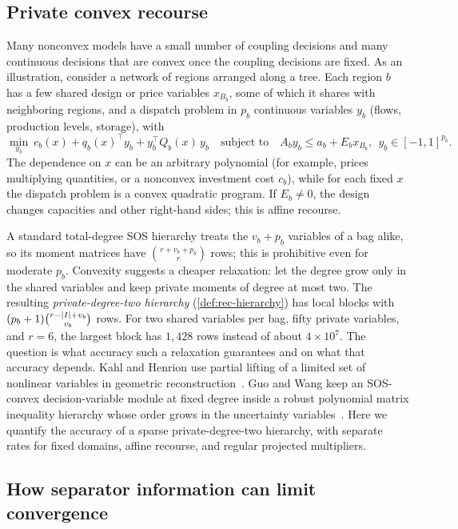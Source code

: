\subsection{Private convex recourse}\label{sec:intro-recourse}

Many nonconvex models have a small number of coupling decisions and many
continuous decisions that are convex once the coupling decisions are fixed.
As an illustration, consider a network of regions arranged along a tree.
Each region $b$ has a few shared design or price variables $x_{B_b}$, some
of which it shares with neighboring regions, and a dispatch problem in
$p_b$ continuous variables $y_b$ (flows, production levels, storage), with
\[
  \min_{y_b}\ c_b(x)+q_b(x)^{\top}y_b+y_b^{\top}Q_b(x)\,y_b
  \quad\text{subject to}\quad A_by_b\le a_b+E_bx_{B_b},\ \ y_b\in[-1,1]^{p_b}.
\]
The dependence on $x$ can be an arbitrary polynomial (for example, prices
multiplying quantities, or a nonconvex investment cost $c_b$), while for
each fixed $x$ the dispatch problem is a convex quadratic program. If
$E_b\ne0$, the design changes capacities and other right-hand sides; this
is affine recourse.

A standard total-degree SOS hierarchy treats the $v_b+p_b$ variables of a
bag alike, so its moment matrices have $\binom{r+v_b+p_b}{r}$ rows; this is
prohibitive even for moderate $p_b$. Convexity suggests a cheaper
relaxation: let the degree grow only in the shared variables and keep
private moments of degree at most two. The resulting
\emph{private-degree-two hierarchy} (\cref{def:rec-hierarchy}) has local
blocks with $(p_b+1)\binom{r-\lvert I\rvert+v_b}{v_b}$ rows. For two shared
variables per bag, fifty private variables, and $r=6$, the largest block has
$1{,}428$ rows instead of about $4\times10^7$. The question is what accuracy
such a relaxation guarantees and on what that accuracy depends.
Kahl and Henrion use partial lifting of a limited set of nonlinear
variables in geometric reconstruction~\cite{kahl2005-globally-optimal-estimates}.
Guo and Wang keep an SOS-convex decision-variable module at fixed degree
inside a robust polynomial matrix inequality hierarchy whose order grows
in the uncertainty variables~\cite{wang2025-a-moment-sum-of-squares}.
Here we quantify the accuracy of a sparse private-degree-two hierarchy,
with separate rates for fixed domains, affine recourse, and regular
projected multipliers.

\subsection{How separator information can limit convergence}\label{sec:intro-mechanism}

